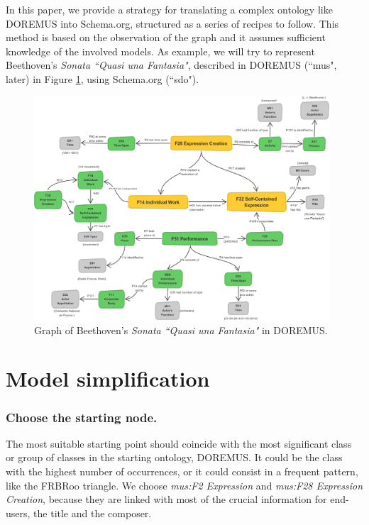 \documentclass{llncs}
\begin{document}
In this paper, we provide a strategy for translating a complex ontology like DOREMUS into Schema.org, structured as a series of recipes to follow.
This method is based on the observation of the graph and it assumes sufficient knowledge of the involved models. As example, we will try to represent Beethoven's \textit{Sonata ``Quasi una Fantasia"}, described in DOREMUS (``mus", later) in Figure \ref{fig:beet-doremus}, using Schema.org (``sdo").

\begin{figure}
\includegraphics[width=11cm]{img/Beethoven-Doremus.png}
\centering
\caption{Graph of Beethoven's \textit{Sonata ``Quasi una Fantasia"} in DOREMUS.}
\label{fig:beet-doremus}
\end{figure}



\section{Model simplification}
\label{sec:simplification}

\subsubsection{Choose the starting node.}
The most suitable starting point should coincide with the most significant class or group of classes in the starting ontology, DOREMUS. It could be the class with the highest number of occurrences, or it could consist in a frequent pattern, like the FRBRoo triangle. We choose \textit{mus:F2 Expression} and \textit{mus:F28 Expression Creation}, because they are linked with most of the crucial information for end-users, the title and the composer.
\end{document}

